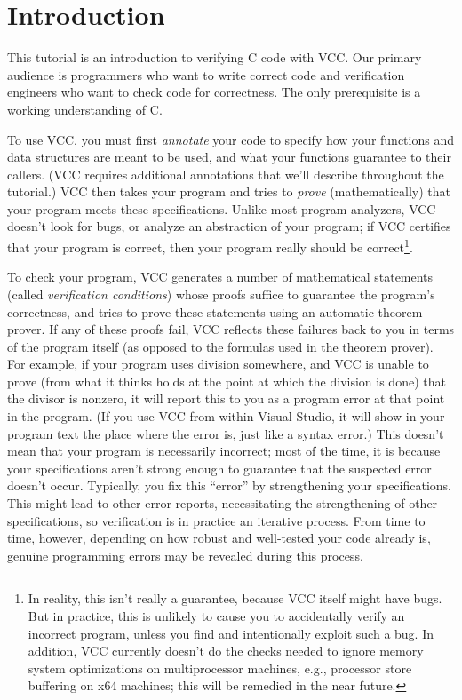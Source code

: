 \section{Introduction}
This tutorial is an introduction to verifying C code with VCC. Our
primary audience is programmers who want to write correct code and
verification engineers who want to check code for correctness. The
only prerequisite is a working understanding of C. 

To use VCC, you must first \emph{annotate} your code to specify how
your functions and data structures are meant to be used, and what your
functions guarantee to their callers. (VCC requires additional
annotations that we'll describe throughout the tutorial.) VCC then
takes your program and tries to \emph{prove} (mathematically) that
your program meets these specifications.  Unlike most program
analyzers, VCC doesn't look for bugs, or analyze an abstraction of
your program; if VCC certifies that your program is correct, then your
program really should be correct\footnote{In reality, this isn't
  really a guarantee, because VCC itself might have bugs. But in
  practice, this is unlikely to cause you to accidentally verify an
  incorrect program, unless you find and intentionally exploit such a
  bug. In addition, VCC currently doesn't do the checks needed to
  ignore memory system optimizations on multiprocessor machines, e.g.,
  processor store buffering on x64 machines; this will be remedied in the near
  future.}. 

To check your program, VCC generates a number of mathematical
statements (called \emph{verification conditions}) whose proofs
suffice to guarantee the program's correctness, and tries to prove
these statements using an automatic theorem prover. If any of these
proofs fail, VCC reflects these failures back to you in terms of the
program itself (as opposed to the formulas used in the theorem prover).
For example, if your program uses division
somewhere, and VCC is unable to prove (from what it thinks holds at the
point at which the division is done) that the divisor is nonzero, it
will report this to you as a program error at that point in the
program. (If you use VCC from within Visual Studio, it will show in
your program text the place where the error is, just like a syntax
error.) This doesn't mean that your program is necessarily incorrect;
most of the time, it is because your specifications aren't strong
enough to guarantee that the suspected error doesn't occur.
Typically, you fix this ``error'' by strengthening your
specifications. This might lead to other error reports, necessitating
the strengthening of other specifications, so verification is in
practice an iterative process.  From time to time, however, depending on how
robust and well-tested your code already is, genuine programming errors may be
revealed during this process.

